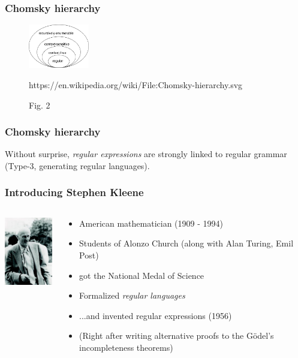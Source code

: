 \documentclass[aspectratio=169,xcolor=table]{beamer}
\begin{document}
\begin{frame}
  \frametitle{Chomsky hierarchy}
    \begin{figure}
      \begin{center}
        \includegraphics[width=100px]{images/Chomsky-hierarchy.png}
      \end{center}
      \caption{Fig. 2}{https://en.wikipedia.org/wiki/File:Chomsky-hierarchy.svg}
    \end{figure}
\end{frame}


\begin{frame}
  \frametitle{Chomsky hierarchy}
  Without surprise, \textit{regular expressions} are strongly linked
  to regular grammar (Type-3, generating regular languages).
\end{frame}


\begin{frame}
  \frametitle{Introducing Stephen Kleene}
  \begin{columns}[T]
    \begin{column}{.3\textwidth}
      \includegraphics[width=100px]{images/kleene.jpg}
    \end{column}
    \begin{column}{.7\textwidth}
      \begin{itemize}
      \item American mathematician (1909 - 1994) \pause
      \item Students of Alonzo Church (along with
        Alan Turing, Emil Post) \pause
      \item got the National Medal of Science \pause
      \item Formalized \textit{regular languages} \pause
      \item ...and invented regular expressions (1956) \pause
      \item (Right after writing alternative proofs to the G\"odel's
        incompleteness theorems)
      \end{itemize}
    \end{column}
  \end{columns}
\end{frame}
\end{document}
